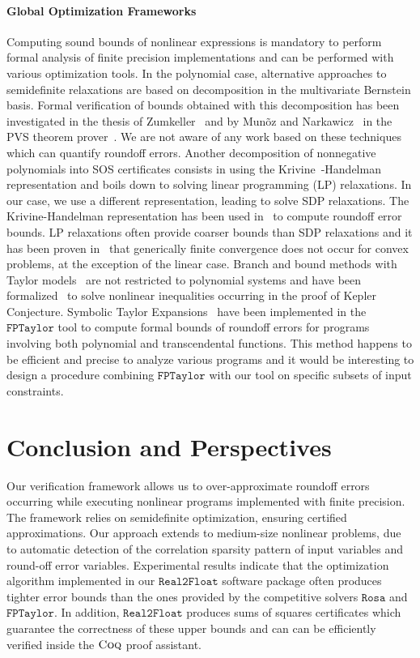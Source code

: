 \documentclass[preprint,fleqn,nocopyrightspace]{sigplanconf}
\newcommand{\realtofloat}{\mathtt{Real2Float}}
\newcommand{\coq}{\text{\sc Coq}}
\newcommand{\rosa}{\mathtt{Rosa}}
\newcommand{\fptaylor}{\mathtt{FPTaylor}}
\theoremstyle{plain}
\begin{document}
\paragraph{Global Optimization Frameworks}
Computing sound bounds of nonlinear expressions is mandatory to perform formal analysis of finite precision implementations and can be performed with various optimization tools. 
In the polynomial case, alternative approaches to semidefinite relaxations are based on decomposition in the multivariate Bernstein basis. Formal verification of bounds obtained with this decomposition has been investigated in the thesis of Zumkeller~\cite{ZumkellerPhD} and by Mun\~oz and Narkawicz~\cite{MN13} in the PVS theorem prover~\cite{PVS}. We are not aware of any work based on these techniques which can quantify roundoff errors. Another decomposition of nonnegative polynomials into SOS certificates consists in using the Krivine~\cite{Krivine1964b}-Handelman~\cite{Handelman1988} representation and boils down to solving linear programming (LP) relaxations. In our case, we use a different representation, leading to solve SDP relaxations. The Krivine-Handelman representation has been used in~\cite{Boland10HGR} to compute roundoff error bounds. LP relaxations often provide coarser bounds than SDP relaxations and it has been proven in~\cite{lasserre2009moments} that generically finite convergence does not occur for convex problems, at the exception of the linear case. 
Branch and bound methods with Taylor models~\cite{Berz09} are not restricted to polynomial systems and have been formalized~\cite{SolovyevH13} to solve nonlinear inequalities occurring in the proof of Kepler Conjecture. Symbolic Taylor Expansions~\cite{fptaylor15} have been implemented in the $\fptaylor$ tool to compute formal bounds of roundoff errors for programs involving both polynomial and transcendental functions. This method happens to be efficient and precise to analyze various programs and it would be interesting to design a procedure combining $\fptaylor$ with our tool on specific subsets of input constraints.
%
\section{Conclusion and Perspectives} %
%
Our verification framework allows us to over-approximate roundoff errors occurring while executing nonlinear programs implemented with finite precision.
The framework relies on semidefinite optimization, ensuring certified approximations. Our approach extends to medium-size nonlinear problems, due to  automatic detection of the correlation sparsity pattern of input variables and round-off error variables. 
Experimental results indicate that the optimization algorithm implemented in our $\realtofloat$ software package often produces tighter error bounds than the ones provided by the competitive solvers $\rosa$ and $\fptaylor$.  In addition, $\realtofloat$ produces sums of squares certificates which guarantee the correctness of these upper bounds and can can be efficiently verified inside the $\coq$ proof assistant.
\end{document}
